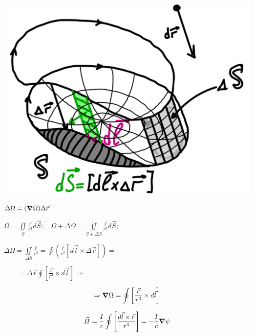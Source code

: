 \begin{minipage}[c]{0.4\textwidth} %
    \includegraphics[width=\textwidth]{im/65.png}{} %
\end{minipage}%
\hfill
\begin{minipage}[c]{0.55\textwidth} %
    \( \Delta\Omega =(\grad\Omega)\Delta \vec{r} \) 

    \( \Omega= \underset{S}{\iint}\frac{\vec{r}}{r^3}d\vec{S};\quad \Omega+\Delta\Omega =\underset{S+\Delta S}{\iint} \frac{\vec{r}}{r^3}d\vec{S};  \)
    
    \( \Delta\Omega= \underset{\Delta S}{\iint} \frac{\vec{r}}{r^3}= \oint \left( \frac{\vec{r}}{r^3}[d\vec{l}\times \Delta\vec{r}]  \right)=  \)

    \(\qquad = \Delta\vec{r} \oint \left[ \frac{\vec{r}}{r^3}\times d\vec{l}  \right] \Rightarrow   \) 
\end{minipage}

\[
\Rightarrow \grad\Omega=\oint \left[ \frac{\vec{r}}{r^3}\times d\vec{l}  \right]
\]

\[
\vec{H}=\frac{I}{c}\oint \left[ \frac{d\vec{l} \times \vec{r}}{r^3}  \right] = -\frac{I}{c} \grad \psi
\]